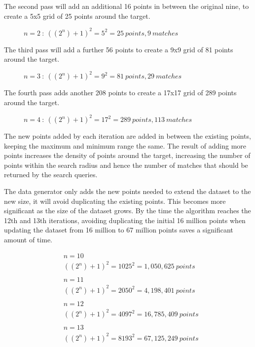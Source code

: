 \documentclass{article}
\newcommand{\dataset} {dataset\xspace}
\begin{document}
The second pass will add an additional 16 points in between the original nine, to create a 5x5 grid of 25 points around the target. 
\begin{figure}[hbt!]
\centering

\caption{$n=2 \ :\ ((2^n)+1)^2 = 5^2 = 25 \ points, 9 \ matches$}
\label{fig:data-count-02}
\end{figure}

The third pass will add a further 56 points to create a 9x9 grid of 81 points around the target. 
\begin{figure}[hbt!]
\centering

\caption{$n=3 \ :\ ((2^n)+1)^2 = 9^2 = 81 \ points, 29 \ matches$}
\label{fig:data-count-03}
\end{figure}

The fourth pass adds another 208 points to create a 17x17 grid of 289 points around the target.
\begin{figure}[hbt!]
\centering

\caption{$n=4 \ :\ ((2^n)+1)^2 = 17^2 = 289 \ points, 113 \ matches$}
\label{fig:data-count-04}
\end{figure}

The new points added by each iteration are added in between the existing points, keeping the maximum and minimum range the same. The result of adding more points increases the density of points around the target, increasing the number of points within the search radius and hence the number of matches that should be returned by the search queries.

The data generator only adds the new points needed to extend the \dataset to the new size, it will avoid duplicating the existing points.
This becomes more significant as the size of the \dataset grows. By the time the algorithm reaches the 12th and 13th iterations, avoiding duplicating the initial 16 million points when updating the \dataset from 16 million to 67 million points saves a significant amount of time.

\begin{equation*}
\begin{split}
& n = 10\\
& ((2^n)+1)^2 = 1025^2 = 1,050,625 \ points
\\
\\
& n = 11\\
& ((2^n)+1)^2 = 2050^2 = 4,198,401 \ points
\\
\\
& n = 12\\
& ((2^n)+1)^2 = 4097^2 = 16,785,409 \ points
\\
\\
& n = 13\\
& ((2^n)+1)^2 = 8193^2 = 67,125,249 \ points
\end{split}
\end{equation*}
\end{document}
